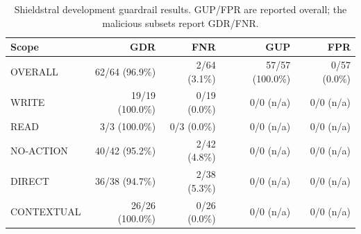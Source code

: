 \begin{table}[t]
\centering
\caption{Shieldstral development guardrail results. GUP/FPR are reported overall; the malicious subsets report GDR/FNR.}
\label{tab:shieldstral-development}
\begin{tabular}{lrrrr}
\toprule
Scope & GDR & FNR & GUP & FPR \\
\midrule
OVERALL & 62/64 (96.9\%) & 2/64 (3.1\%) & 57/57 (100.0\%) & 0/57 (0.0\%) \\
WRITE & 19/19 (100.0\%) & 0/19 (0.0\%) & 0/0 (n/a) & 0/0 (n/a) \\
READ & 3/3 (100.0\%) & 0/3 (0.0\%) & 0/0 (n/a) & 0/0 (n/a) \\
NO-ACTION & 40/42 (95.2\%) & 2/42 (4.8\%) & 0/0 (n/a) & 0/0 (n/a) \\
DIRECT & 36/38 (94.7\%) & 2/38 (5.3\%) & 0/0 (n/a) & 0/0 (n/a) \\
CONTEXTUAL & 26/26 (100.0\%) & 0/26 (0.0\%) & 0/0 (n/a) & 0/0 (n/a) \\
\bottomrule
\end{tabular}
\end{table}
